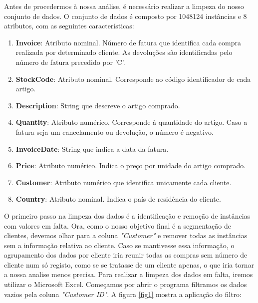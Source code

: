 \documentclass{easychair}
\begin{document}
Antes de procedermos à nossa análise, é necessário realizar a limpeza do nosso conjunto de dados. O conjunto de dados é composto por 1048124 instâncias e 8 atributos, com as seguintes características:

\begin{enumerate}
    \item \textbf{Invoice}: Atributo nominal. Número de fatura que identifica cada compra realizada por determinado cliente. As devoluções são identificadas pelo número de fatura precedido por 'C'.
    \item \textbf{StockCode}: Atributo nominal. Corresponde ao código identificador de cada artigo.
    \item \textbf{Description}: String que descreve o artigo comprado.
    \item \textbf{Quantity}: Atributo numérico. Corresponde à quantidade do artigo. Caso a fatura seja um cancelamento ou devolução, o número é negativo.
    \item \textbf{InvoiceDate}: String que indica a data da fatura.
    \item \textbf{Price}: Atributo numérico. Indica o preço por unidade do artigo comprado.
    \item \textbf{Customer}: Atributo numérico que identifica unicamente cada cliente.
    \item \textbf{Country}: Atributo nominal. Indica o país de residência do cliente.
\end{enumerate}

O primeiro passo na limpeza dos dados é a identificação e remoção de instâncias com valores em falta. Ora, como o nosso objetivo final é a segmentação de clientes, devemos olhar para a coluna \textit{"Customer"} e remover todas as instâncias sem a informação relativa ao cliente. Caso se mantivesse essa informação, o agrupamento dos dados por cliente iria reunir todas as compras sem número de cliente num só registo, como se se tratasse de um cliente apenas, o que iria tornar a nossa analise menos precisa.
Para realizar a limpeza dos dados em falta, iremos utilizar o Microsoft Excel. Começamos por abrir o programa filtramos os dados vazios pela coluna \textit{"Customer ID"}. A figura \ref{fig1} mostra a aplicação do filtro:
\end{document}
